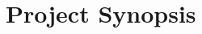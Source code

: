 \documentclass[12pt]{report}
\begin{document}

\begin{screen}
\ppttitle
\end{screen}
\footskip 0.7cm
\thispagestyle{empty} 
\pagetitle
\newpage
{}
\cfoot{\thepage}

%

%

\newpage
\newpage

\cfoot{\thepage}

\newpage
\chapter{Project Synopsis}

%
%
%
%
%
%

\end{document}
